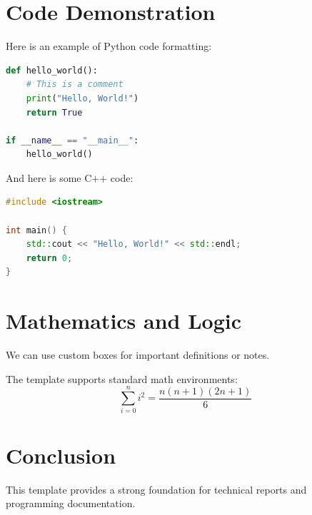 \documentclass{article}
\begin{document}
\section{Code Demonstration}
Here is an example of Python code formatting:

\begin{lstlisting}[language=Python, caption=Example Python Code]
def hello_world():
    # This is a comment
    print("Hello, World!")
    return True

if __name__ == "__main__":
    hello_world()
\end{lstlisting}

And here is some C++ code:

\begin{lstlisting}[language=C++]
#include <iostream>

int main() {
    std::cout << "Hello, World!" << std::endl;
    return 0;
}
\end{lstlisting}

\section{Mathematics and Logic}
\begin{infobox}[Note]
    We can use custom boxes for important definitions or notes.
\end{infobox}

The template supports standard math environments:
\begin{equation}
    \sum_{i=0}^{n} i^2 = \frac{n(n+1)(2n+1)}{6}
\end{equation}

\section{Conclusion}
This template provides a strong foundation for technical reports and programming documentation.
\end{document}
